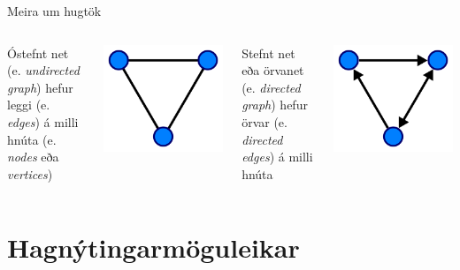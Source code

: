\documentclass{beamer}
\begin{document}
\begin{frame}{Meira um hugtök}
\begin{columns}
Óstefnt net (e. \emph{undirected graph}) hefur leggi (e. \emph{edges}) á milli hnúta (e. \emph{nodes} eða \emph{vertices})
\begin{center}
\includegraphics[width=0.7\linewidth]{Pics/undirected}
\end{center}
Stefnt net eða örvanet (e. \emph{directed graph}) hefur örvar (e. \emph{directed edges}) á milli hnúta
\begin{center}
\includegraphics[width=0.7\linewidth]{Pics/directed}
\end{center}
\end{columns}
\end{frame}

\section{Hagnýtingarmöguleikar}
\end{document}
